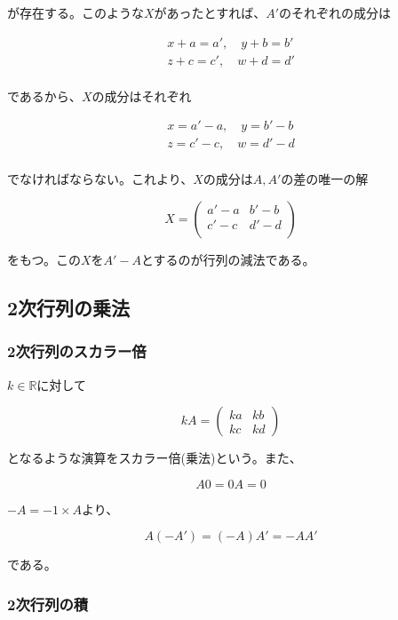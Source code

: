 \documentclass[dvipdfmx,autodetect-engine]{jsarticle}
\begin{document}
が存在する。このような$X$があったとすれば、$A'$のそれぞれの成分は

\begin{eqnarray*}
x + a = a', \quad y + b = b' \\
z + c = c', \quad w + d = d' \\
\end{eqnarray*}

であるから、$X$の成分はそれぞれ

\begin{eqnarray*}
x = a' - a, \quad y = b' - b \\
z = c' - c, \quad w = d' - d \\
\end{eqnarray*}

でなければならない。これより、$X$の成分は$A, A'$の差の唯一の解


$$
X = \begin{pmatrix}
a' - a & b' - b \\
c' - c & d' - d \\
\end{pmatrix}
$$

をもつ。この$X$を$A'-A$とするのが行列の減法である。

\subsection{2次行列の乗法}\label{subsubsection:matrixMultiple}

\subsubsection{2次行列のスカラー倍}

$k \in \mathbb{R}$に対して

$$
kA = \begin{pmatrix}
ka & kb \\
kc & kd
\end{pmatrix}
$$

となるような演算をスカラー倍(乗法)という。また、

$$
A0 = 0A = 0
$$

$-A = -1 \times A$より、

$$
A(-A') = (-A)A' = -AA'
$$

である。

\subsubsection{2次行列の積}
\end{document}
